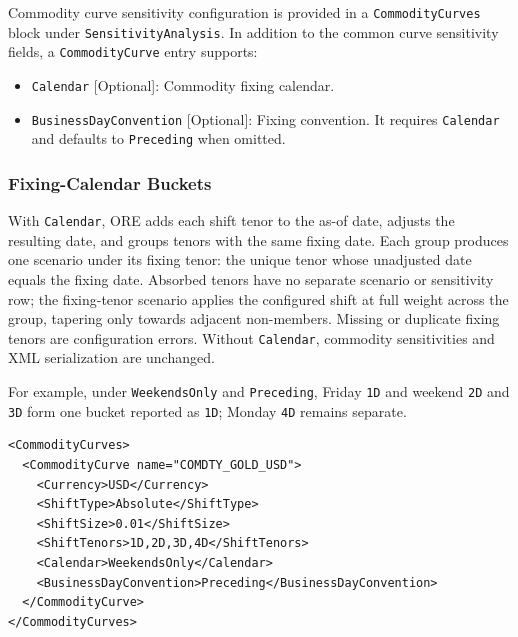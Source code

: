 Commodity curve sensitivity configuration is provided in a \lstinline!CommodityCurves! block under
\lstinline!SensitivityAnalysis!. In addition to the common curve sensitivity fields, a
\lstinline!CommodityCurve! entry supports:

\begin{itemize}
\item \lstinline!Calendar! [Optional]: Commodity fixing calendar.
\item \lstinline!BusinessDayConvention! [Optional]: Fixing convention. It requires \lstinline!Calendar! and
  defaults to \lstinline!Preceding! when omitted.
\end{itemize}

\subsubsection*{Fixing-Calendar Buckets}

With \lstinline!Calendar!, ORE adds each shift tenor to the as-of date, adjusts the resulting date, and
groups tenors with the same fixing date. Each group produces one scenario under its fixing tenor: the
unique tenor whose unadjusted date equals the fixing date. Absorbed tenors have no separate scenario or
sensitivity row; the fixing-tenor scenario applies the configured shift at full weight across the group,
tapering only towards adjacent non-members. Missing or duplicate fixing tenors are configuration errors.
Without \lstinline!Calendar!, commodity sensitivities and XML serialization are unchanged.

For example, under \lstinline!WeekendsOnly! and \lstinline!Preceding!, Friday \lstinline!1D! and weekend
\lstinline!2D! and \lstinline!3D! form one bucket reported as \lstinline!1D!; Monday \lstinline!4D!
remains separate.

\begin{longlisting}
\begin{verbatim}
<CommodityCurves>
  <CommodityCurve name="COMDTY_GOLD_USD">
    <Currency>USD</Currency>
    <ShiftType>Absolute</ShiftType>
    <ShiftSize>0.01</ShiftSize>
    <ShiftTenors>1D,2D,3D,4D</ShiftTenors>
    <Calendar>WeekendsOnly</Calendar>
    <BusinessDayConvention>Preceding</BusinessDayConvention>
  </CommodityCurve>
</CommodityCurves>
\end{verbatim}
\caption{Commodity curve sensitivity configuration with fixing-calendar bucketing}
\label{lst:sensitivity_commodity_curves}
\end{longlisting}
